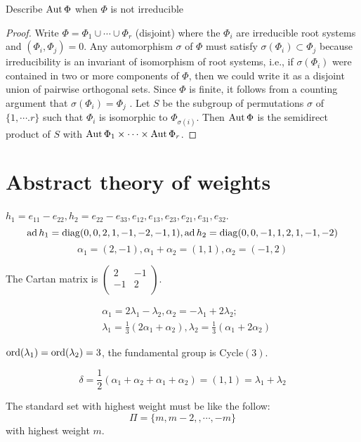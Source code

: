 \begin{ex}
  Describe $\operatorname{Aut}\Phi$ when $\Phi$ is not irreducible
\end{ex}
\begin{proof}
  Write $\Phi = \Phi_1 \cup \cdots \cup \Phi_r$ (disjoint) where the $\Phi_i$ are irreducible root systems and $(\Phi_i,\Phi_j) = 0$. Any automorphism $\sigma$ of $\Phi$ must satisfy $\sigma(\Phi_i) \subset \Phi_j$ because irreducibility is an invariant of isomorphism of root systems, i.e., if $\sigma(\Phi_i)$ were contained in two or more components of $\Phi$, then we could write it as a disjoint union of pairwise orthogonal sets. Since $\Phi$ is finite, it follows from a counting argument that $\sigma(\Phi_i) = \Phi_j$ . Let $S$ be the subgroup of permutations $\sigma$ of $\{1,\cdots. r\}$ such that $\Phi_i$ is isomorphic to $\Phi_{\sigma(i)}$. Then $\operatorname{Aut}\Phi$ is the semidirect product of $S$ with $\operatorname{Aut}\Phi_1 \times \cdots \times \operatorname{Aut}\Phi_r$.
\end{proof}

\section{Abstract theory of weights}

\begin{exam}[$\sl(3,F)$]
  $h_1=e_{11}-e_{22}, h_2=e_{22}-e_{33}, e_{12}, e_{13}, e_{23}, e_{21}, e_{31}, e_{32}$.
  \begin{equation*}
    \operatorname{ad} h_1= \operatorname{diag}(0,0,2,1,-1,-2,-1,1), \operatorname{ad} h_2=\operatorname{diag}(0,0,-1,1,2,1,-1,-2)
  \end{equation*}
  \begin{equation*}
  \alpha_1=(2,-1), \alpha_1+\alpha_2=(1,1), \alpha_2=(-1,2)
  \end{equation*}
  
  The Cartan matrix is $\begin{pmatrix}
                          2 & -1 \\
                          -1 & 2 \\
                        \end{pmatrix}$.
  
  \begin{align*}
    &\alpha_1=2\lambda_1-\lambda_2, \alpha_2=-\lambda_1+2\lambda_2;\\
    &\lambda_1=\frac{1}{3}(2\alpha_1+\alpha_2), \lambda_2=\frac{1}{3}(\alpha_1+2\alpha_2)
  \end{align*}
  
  $\operatorname{ord}(\lambda_1)=\operatorname{ord}(\lambda_2)=3$, the fundamental group is Cycle$(3)$.
  
  \begin{equation*}
    \delta=\frac{1}{2}(\alpha_1+\alpha_2+\alpha_1+\alpha_2)=(1,1)=\lambda_1+\lambda_2
  \end{equation*}
  
  The standard set with highest weight must be like the follow:
  \begin{equation*}
    \Pi=\{m,m-2,,\cdots,-m\}
  \end{equation*}
  with highest weight $m$.
\end{exam}

